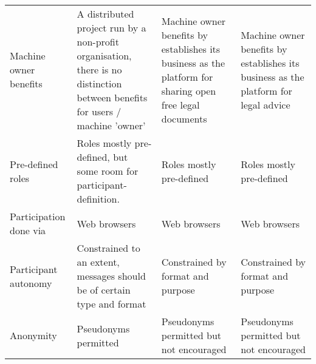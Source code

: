 \documentclass{sig-alternate}
\begin{document}
\begin{table}[htp]
    \begin{tabular}{|p{3.5cm}|p{4cm}|p{4cm}|p{4cm}|}
    \hline
    Machine owner benefits            & A distributed project run by a non-profit organisation, there is no distinction between benefits for users / machine 'owner' & Machine owner benefits by establishes its business as the platform for sharing open free legal documents & Machine owner benefits by establishes its business as the platform for legal advice \\
    Pre-defined roles                 & Roles mostly pre-defined, but some room for participant-definition.                                                                                                      & Roles mostly pre-defined                                                                                 & Roles mostly pre-defined                                                            \\
    Participation done via            & Web browsers                                                                                                                                                             & Web browsers                                                                                             & Web browsers                                                                        \\
    Participant autonomy              & Constrained to an extent, messages should be of certain type and format                                                                                                 & Constrained by format and purpose                                                                        & Constrained by format and purpose                                                   \\
    Anonymity                         & Pseudonyms permitted                                                                                                                                                     & Pseudonyms permitted but not encouraged                                                                  & Pseudonyms permitted but not encouraged                                             \\

\end{tabular}
\end{table}
\end{document}
